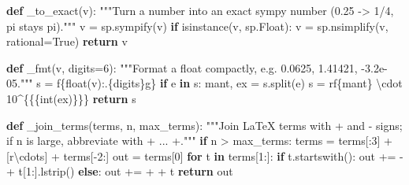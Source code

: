 \documentclass[
  letterpaper,
  DIV=11,
  numbers=noendperiod]{scrreprt}
\newenvironment{Shaded}{\begin{snugshade}}{\end{snugshade}}
\newcommand{\BuiltInTok}[1]{\textcolor[rgb]{0.00,0.23,0.31}{#1}}
\newcommand{\CharTok}[1]{\textcolor[rgb]{0.13,0.47,0.30}{#1}}
\newcommand{\CommentTok}[1]{\textcolor[rgb]{0.37,0.37,0.37}{#1}}
\newcommand{\ControlFlowTok}[1]{\textcolor[rgb]{0.00,0.23,0.31}{\textbf{#1}}}
\newcommand{\DecValTok}[1]{\textcolor[rgb]{0.68,0.00,0.00}{#1}}
\newcommand{\ErrorTok}[1]{\textcolor[rgb]{0.68,0.00,0.00}{#1}}
\newcommand{\KeywordTok}[1]{\textcolor[rgb]{0.00,0.23,0.31}{\textbf{#1}}}
\newcommand{\NormalTok}[1]{\textcolor[rgb]{0.00,0.23,0.31}{#1}}
\newcommand{\OperatorTok}[1]{\textcolor[rgb]{0.37,0.37,0.37}{#1}}
\newcommand{\SpecialCharTok}[1]{\textcolor[rgb]{0.37,0.37,0.37}{#1}}
\newcommand{\SpecialStringTok}[1]{\textcolor[rgb]{0.13,0.47,0.30}{#1}}
\newcommand{\StringTok}[1]{\textcolor[rgb]{0.13,0.47,0.30}{#1}}
\newcommand{\VariableTok}[1]{\textcolor[rgb]{0.07,0.07,0.07}{#1}}
\newcommand{\VerbatimStringTok}[1]{\textcolor[rgb]{0.13,0.47,0.30}{#1}}
\theoremstyle{plain}
\theoremstyle{plain}
\theoremstyle{definition}
\theoremstyle{definition}
\theoremstyle{definition}
\theoremstyle{plain}
\theoremstyle{plain}
\theoremstyle{remark}
\begin{document}
\begin{Shaded}
\begin{Highlighting}[]
\KeywordTok{def}\NormalTok{ \_to\_exact(v):}
    \CommentTok{"""Turn a number into an exact sympy number (0.25 {-}\textgreater{} 1/4, pi stays pi)."""}
\NormalTok{    v }\OperatorTok{=}\NormalTok{ sp.sympify(v)}
    \ControlFlowTok{if} \BuiltInTok{isinstance}\NormalTok{(v, sp.Float):}
\NormalTok{        v }\OperatorTok{=}\NormalTok{ sp.nsimplify(v, rational}\OperatorTok{=}\VariableTok{True}\NormalTok{)}
    \ControlFlowTok{return}\NormalTok{ v}


\KeywordTok{def}\NormalTok{ \_fmt(v, digits}\OperatorTok{=}\DecValTok{6}\NormalTok{):}
    \CommentTok{"""Format a float compactly, e.g. 0.0625, 1.41421, {-}3.2e{-}05."""}
\NormalTok{    s }\OperatorTok{=} \SpecialStringTok{f\textquotesingle{}}\SpecialCharTok{\{}\BuiltInTok{float}\NormalTok{(v)}\SpecialCharTok{:.}\NormalTok{\{digits\}g}\SpecialCharTok{\}}\SpecialStringTok{\textquotesingle{}}
    \ControlFlowTok{if} \StringTok{\textquotesingle{}e\textquotesingle{}} \KeywordTok{in}\NormalTok{ s:}
\NormalTok{        mant, ex }\OperatorTok{=}\NormalTok{ s.split(}\StringTok{\textquotesingle{}e\textquotesingle{}}\NormalTok{)}
\NormalTok{        s }\OperatorTok{=} \VerbatimStringTok{rf\textquotesingle{}}\SpecialCharTok{\{}\NormalTok{mant}\SpecialCharTok{\}}\VerbatimStringTok{ }\ErrorTok{\textbackslash{}}\VerbatimStringTok{cdot 10}\DecValTok{\^{}}\CharTok{\{\{}\SpecialCharTok{\{}\BuiltInTok{int}\NormalTok{(ex)}\SpecialCharTok{\}}\CharTok{\}\}}\VerbatimStringTok{\textquotesingle{}}
    \ControlFlowTok{return}\NormalTok{ s}


\KeywordTok{def}\NormalTok{ \_join\_terms(terms, n, max\_terms):}
    \CommentTok{"""Join LaTeX terms with + and {-} signs; if n is large, abbreviate with + ... +."""}
    \ControlFlowTok{if}\NormalTok{ n }\OperatorTok{\textgreater{}}\NormalTok{ max\_terms:}
\NormalTok{        terms }\OperatorTok{=}\NormalTok{ terms[:}\DecValTok{3}\NormalTok{] }\OperatorTok{+}\NormalTok{ [}\VerbatimStringTok{r\textquotesingle{}}\ErrorTok{\textbackslash{}}\VerbatimStringTok{cdots\textquotesingle{}}\NormalTok{] }\OperatorTok{+}\NormalTok{ terms[}\OperatorTok{{-}}\DecValTok{2}\NormalTok{:]}
\NormalTok{    out }\OperatorTok{=}\NormalTok{ terms[}\DecValTok{0}\NormalTok{]}
    \ControlFlowTok{for}\NormalTok{ t }\KeywordTok{in}\NormalTok{ terms[}\DecValTok{1}\NormalTok{:]:}
        \ControlFlowTok{if}\NormalTok{ t.startswith(}\StringTok{\textquotesingle{}{-}\textquotesingle{}}\NormalTok{):}
\NormalTok{            out }\OperatorTok{+=} \StringTok{\textquotesingle{} {-} \textquotesingle{}} \OperatorTok{+}\NormalTok{ t[}\DecValTok{1}\NormalTok{:].lstrip()}
        \ControlFlowTok{else}\NormalTok{:}
\NormalTok{            out }\OperatorTok{+=} \StringTok{\textquotesingle{} + \textquotesingle{}} \OperatorTok{+}\NormalTok{ t}
    \ControlFlowTok{return}\NormalTok{ out}



\end{Highlighting}
\end{Shaded}
\end{document}
